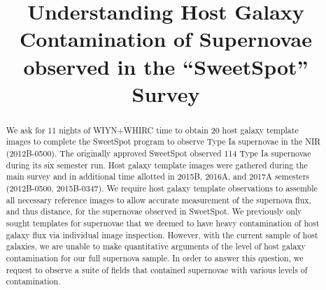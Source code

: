 \documentclass[11pt]{article}
\begin{document}
%
%

\title{Understanding Host Galaxy Contamination of Supernovae observed in the ``SweetSpot'' Survey}



%


\begin{abstract}

We ask for 11 nights of WIYN+WHIRC time to obtain 20 host galaxy template images
to complete the SweetSpot program to observe Type Ia supernovae in the NIR (2012B-0500).
The originally approved SweetSpot observed 114 Type Ia supernovae during its six semester run. 
Host galaxy template images were gathered during the main survey and in additional time allotted in 2015B, 2016A, and 2017A semesters (2012B-0500, 2015B-0347). 
We require host galaxy template observations to assemble all necessary reference images to allow accurate measurement of the supernova flux, and thus distance, for the supernovae observed in SweetSpot.
We previously only sought templates for supernovae that we deemed to have heavy contamination of host galaxy flux via individual image inspection.
However, with the current sample of host galaxies, we are unable to make quantitative arguments of the level of host galaxy contamination for our full supernova sample.
In order to answer this question, we request to observe a suite of fields that contained supernovae with various levels of contamination.   

\end{abstract}
\end{document}
